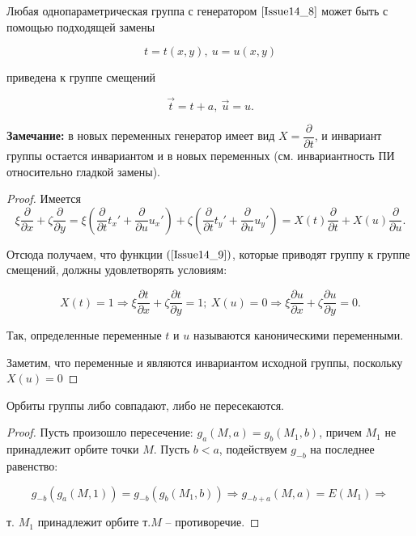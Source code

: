 \begin{theorem}
	Любая однопараметрическая группа с генератором $\ref{Issue14_8}$ может быть с помощью подходящей замены 
	
	\begin{equation}
		t = t(x,y),\ u = u(x,y)
		\label{Issue14_9}
	\end{equation}
	
	приведена к группе смещений 
	
	\begin{equation}
		\vec{t} = t + a,\ \vec{u} = u.
		\label{Issue14_10}
	\end{equation}
	
	\textbf{Замечание:} в новых переменных генератор имеет вид $X = \dfrac{\partial}{\partial t}$, и инвариант группы остается инвариантом и в новых переменных (см. инвариантность ПИ относительно гладкой замены).
	
	\begin{proof}
		
		Имеется \[\xi \dfrac{\partial}{\partial x} + \zeta \dfrac{\partial}{\partial y} = \xi\left(\dfrac{\partial}{\partial t}t_x' + \dfrac{\partial}{\partial u}u_x'\right) + \zeta\left(\dfrac{\partial}{\partial t}t_y' + \dfrac{\partial}{\partial u}u_y'\right) = X(t)\dfrac{\partial}{\partial t} + X(u)\dfrac{\partial}{\partial u}.\]
		
		Отсюда получаем, что функции $(\ref{Issue14_9})$, которые приводят группу к группе смещений, должны удовлетворять условиям:
		
		\begin{equation}
			X(t) = 1 \Rightarrow \xi \dfrac{\partial t}{\partial x} + \zeta \dfrac{\partial t}{\partial y} = 1;\ X(u) = 0 \Rightarrow \xi \dfrac{\partial u}{\partial x} + \zeta \dfrac{\partial u}{\partial y} = 0.
			\label{Issue14_11}
		\end{equation}
		
		Так, определенные переменные $t$ и $u$ называются $\textbf{каноническими переменными}$.
		
		Заметим, что переменные и являются инвариантом исходной группы, поскольку \\
		$X(u) = 0$
		
	\end{proof}
\end{theorem} 


\begin{theorem}
	
	Орбиты группы либо совпадают, либо не пересекаются.
	
	\begin{proof}
		
		Пусть произошло пересечение: $g_a(M,a) = g_b(M_1,b)$, причем $M_1$ не принадлежит орбите точки $M$. Пусть $b < a$, подействуем $g_{-b}$ на последнее равенство:
		
		\[ g_{-b}(g_a(M,1)) = g_{-b}(g_b(M_1, b)) \Rightarrow g_{-b+a}(M,a) = E(M_1) \Rightarrow\]
		
		т. $M_1$ принадлежит орбите т.$M$ -- противоречие.
		
	\end{proof}
	
\end{theorem}


